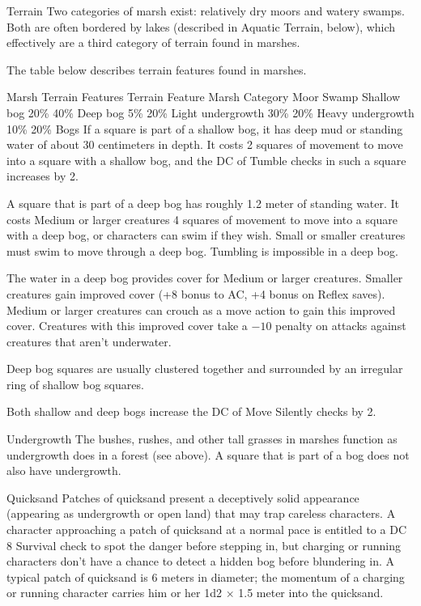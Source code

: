 \Marsh Terrain
Two categories of marsh exist: relatively dry moors and watery swamps. Both are often bordered by lakes (described in Aquatic Terrain, below), which effectively are a third category of terrain found in marshes.

The table below describes terrain features found in marshes.

Marsh Terrain Features
Terrain Feature	Marsh Category
Moor	Swamp
Shallow bog	20\%	40\%
Deep bog	5\%	20\%
Light undergrowth	30\%	20\%
Heavy undergrowth	10\%	20\%
Bogs
If a square is part of a shallow bog, it has deep mud or standing water of about 30 centimeters in depth. It costs 2 squares of movement to move into a square with a shallow bog, and the DC of Tumble checks in such a square increases by 2.

A square that is part of a deep bog has roughly 1.2 meter of standing water. It costs Medium or larger creatures 4 squares of movement to move into a square with a deep bog, or characters can swim if they wish. Small or smaller creatures must swim to move through a deep bog. Tumbling is impossible in a deep bog.

The water in a deep bog provides cover for Medium or larger creatures. Smaller creatures gain improved cover (+8 bonus to AC, +4 bonus on Reflex saves). Medium or larger creatures can crouch as a move action to gain this improved cover. Creatures with this improved cover take a $-10$ penalty on attacks against creatures that aren’t underwater.

Deep bog squares are usually clustered together and surrounded by an irregular ring of shallow bog squares.

Both shallow and deep bogs increase the DC of Move Silently checks by 2.

Undergrowth
The bushes, rushes, and other tall grasses in marshes function as undergrowth does in a forest (see above). A square that is part of a bog does not also have undergrowth.

Quicksand
Patches of quicksand present a deceptively solid appearance (appearing as undergrowth or open land) that may trap careless characters. A character approaching a patch of quicksand at a normal pace is entitled to a DC 8 Survival check to spot the danger before stepping in, but charging or running characters don’t have a chance to detect a hidden bog before blundering in. A typical patch of quicksand is 6 meters in diameter; the momentum of a charging or running character carries him or her 1d2 $\times$ 1.5 meter into the quicksand.

